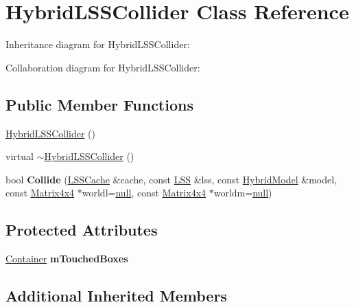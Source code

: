 \hypertarget{class_hybrid_l_s_s_collider}{\section{Hybrid\+L\+S\+S\+Collider Class Reference}
\label{class_hybrid_l_s_s_collider}
}


Inheritance diagram for Hybrid\+L\+S\+S\+Collider\+:


Collaboration diagram for Hybrid\+L\+S\+S\+Collider\+:
\subsection*{Public Member Functions}
\begin{DoxyCompactItemize}
\item 
\hyperlink{class_hybrid_l_s_s_collider_a766334bb5e4944577eaa425d00c45d84}{Hybrid\+L\+S\+S\+Collider} ()
\item 
virtual \hyperlink{class_hybrid_l_s_s_collider_ade63c5a6ff2bb9f94749a6be867afbe7}{$\sim$\+Hybrid\+L\+S\+S\+Collider} ()
\item 
\hypertarget{class_hybrid_l_s_s_collider_ab66b69917863c7fb1dc5229401ce9def}{bool {\bfseries Collide} (\hyperlink{struct_l_s_s_cache}{L\+S\+S\+Cache} \&cache, const \hyperlink{class_l_s_s}{L\+S\+S} \&lss, const \hyperlink{class_hybrid_model}{Hybrid\+Model} \&model, const \hyperlink{class_matrix4x4}{Matrix4x4} $\ast$worldl=\hyperlink{_ice_types_8h_ac97b8ee753e4405397a42ad5799b0f9e}{null}, const \hyperlink{class_matrix4x4}{Matrix4x4} $\ast$worldm=\hyperlink{_ice_types_8h_ac97b8ee753e4405397a42ad5799b0f9e}{null})}\label{class_hybrid_l_s_s_collider_ab66b69917863c7fb1dc5229401ce9def}

\end{DoxyCompactItemize}
\subsection*{Protected Attributes}
\begin{DoxyCompactItemize}
\item 
\hypertarget{class_hybrid_l_s_s_collider_a6c681a5e01363be23e42b9699a9fbe67}{\hyperlink{class_container}{Container} {\bfseries m\+Touched\+Boxes}}\label{class_hybrid_l_s_s_collider_a6c681a5e01363be23e42b9699a9fbe67}

\end{DoxyCompactItemize}
\subsection*{Additional Inherited Members}


